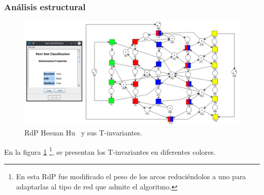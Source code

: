 \subsubsection{Análisis estructural}
\hfill
\begin{figure}[H]
	\centering
	\includegraphics[width=\textwidth]{Figures/testing/fig3_deadlock.png}
	\caption[RdP Hesuan Hu y sus T-invariantes.]{RdP Hesuan Hu \footnotemark \ y sus T-invariantes.}
	\label{fig:hesuan_hu_tinvariantes}
 \end{figure} 

En la figura \ref{fig:hesuan_hu_tinvariantes} \footnote{En esta RdP fue modificado el peso de los arcos reduciéndolos a uno para adaptarlas al tipo de red que admite el algoritmo.}, se presentan los T-invariantes en diferentes colores.\\

